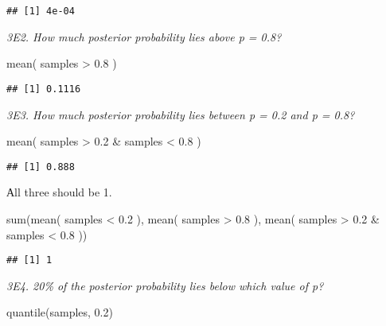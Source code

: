 \documentclass[
]{book}
\newenvironment{Shaded}{\begin{snugshade}}{\end{snugshade}}
\newcommand{\FloatTok}[1]{\textcolor[rgb]{0.00,0.00,0.81}{#1}}
\newcommand{\FunctionTok}[1]{\textcolor[rgb]{0.00,0.00,0.00}{#1}}
\newcommand{\NormalTok}[1]{#1}
\newcommand{\SpecialCharTok}[1]{\textcolor[rgb]{0.00,0.00,0.00}{#1}}
\begin{document}
\begin{verbatim}
## [1] 4e-04
\end{verbatim}

\emph{3E2. How much posterior probability lies above p = 0.8?}

\begin{Shaded}
\begin{Highlighting}[]
\FunctionTok{mean}\NormalTok{( samples }\SpecialCharTok{\textgreater{}} \FloatTok{0.8}\NormalTok{ )}
\end{Highlighting}
\end{Shaded}

\begin{verbatim}
## [1] 0.1116
\end{verbatim}

\emph{3E3. How much posterior probability lies between p = 0.2 and p = 0.8?}

\begin{Shaded}
\begin{Highlighting}[]
\FunctionTok{mean}\NormalTok{( samples }\SpecialCharTok{\textgreater{}} \FloatTok{0.2} \SpecialCharTok{\&}\NormalTok{ samples }\SpecialCharTok{\textless{}} \FloatTok{0.8}\NormalTok{ )}
\end{Highlighting}
\end{Shaded}

\begin{verbatim}
## [1] 0.888
\end{verbatim}

Аll three should be 1.

\begin{Shaded}
\begin{Highlighting}[]
\FunctionTok{sum}\NormalTok{(}\FunctionTok{mean}\NormalTok{( samples }\SpecialCharTok{\textless{}} \FloatTok{0.2}\NormalTok{ ), }\FunctionTok{mean}\NormalTok{( samples }\SpecialCharTok{\textgreater{}} \FloatTok{0.8}\NormalTok{ ), }\FunctionTok{mean}\NormalTok{( samples }\SpecialCharTok{\textgreater{}} \FloatTok{0.2} \SpecialCharTok{\&}\NormalTok{ samples }\SpecialCharTok{\textless{}} \FloatTok{0.8}\NormalTok{ ))}
\end{Highlighting}
\end{Shaded}

\begin{verbatim}
## [1] 1
\end{verbatim}

\emph{3E4. 20\% of the posterior probability lies below which value of p?}

\begin{Shaded}
\begin{Highlighting}[]
\FunctionTok{quantile}\NormalTok{(samples, }\FloatTok{0.2}\NormalTok{)}
\end{Highlighting}
\end{Shaded}
\end{document}
